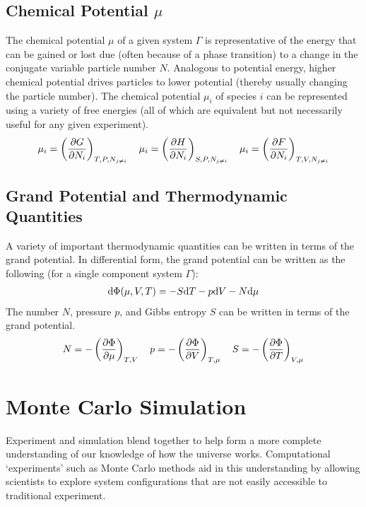 \subsection{Chemical Potential $\mu$}
The chemical potential $\mu$ of a given system $\Gamma$ is representative of the energy that can be gained or lost due (often because of a phase transition) to a change in the conjugate variable particle number $N$. Analogous to potential energy, higher chemical potential drives particles to lower potential (thereby usually changing the particle number). The chemical potential $\mu_i$ of species $i$ can be represented using a variety of free energies (all of which are equivalent but not necessarily useful for any given experiment).
\begin{align}
    \mu_i = \left( \pdv{G}{N_i}\right )_{T,P,N_{j \neq i}}  \quad
    \mu_i = \left( \pdv{H}{N_i}\right )_{S,P,N_{j \neq i}}  \quad
    \mu_i = \left( \pdv{F}{N_i}\right )_{T,V,N_{j \neq i}}  
\end{align}

\subsection{Grand Potential and Thermodynamic Quantities}
A variety of important thermodynamic quantities can be written in terms of the grand potential. In differential form, the grand potential can be written as the following (for a single component system $\Gamma$):
\begin{align}
    \text{d}\Phi(\mu,V,T) = -S\text{d}T-p\text{d}V-N\text{d}\mu
\end{align}
The number $N$, pressure $p$, and Gibbs entropy $S$ can be written in terms of the grand potential.
\begin{align}
    N = -\left( \pdv{\Phi}{\mu}\right )_{T,V}  \quad
    p = -\left( \pdv{\Phi}{V}\right )_{T,\mu}  \quad
    S = -\left( \pdv{\Phi}{T}\right )_{V, \mu} 
\end{align}


\section{Monte Carlo Simulation}\label{monte}
Experiment and simulation blend together to help form a more complete understanding of our knowledge of how the universe works. Computational `experiments' such as Monte Carlo methods aid in this understanding by allowing scientists to explore system configurations that are not easily accessible to traditional experiment.

